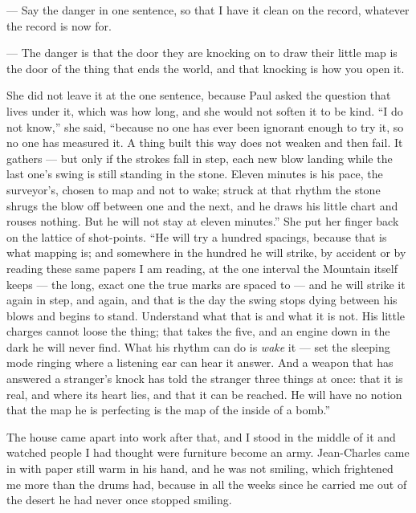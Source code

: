 \begin{room}

--- Say the danger in one sentence, so that I have it clean on the record, whatever the record is now for.

--- The danger is that the door they are knocking on to draw their little map is the door of the thing that ends the world, and that knocking is how you open it.

\end{room}

She did not leave it at the one sentence, because Paul asked the question that lives under it, which was how long, and she would not soften it to be kind. ``I do not know,'' she said, ``because no one has ever been ignorant enough to try it, so no one has measured it. A thing built this way does not weaken and then fail. It gathers --- but only if the strokes fall in step, each new blow landing while the last one's swing is still standing in the stone. Eleven minutes is his pace, the surveyor's, chosen to map and not to wake; struck at that rhythm the stone shrugs the blow off between one and the next, and he draws his little chart and rouses nothing. But he will not stay at eleven minutes.'' She put her finger back on the lattice of shot-points. ``He will try a hundred spacings, because that is what mapping is; and somewhere in the hundred he will strike, by accident or by reading these same papers I am reading, at the one interval the Mountain itself keeps --- the long, exact one the true marks are spaced to --- and he will strike it again in step, and again, and that is the day the swing stops dying between his blows and begins to stand. Understand what that is and what it is not. His little charges cannot loose the thing; that takes the five, and an engine down in the dark he will never find. What his rhythm can do is \emph{wake} it --- set the sleeping mode ringing where a listening ear can hear it answer. And a weapon that has answered a stranger's knock has told the stranger three things at once: that it is real, and where its heart lies, and that it can be reached. He will have no notion that the map he is perfecting is the map of the inside of a bomb.''\par

The house came apart into work after that, and I stood in the middle of it and watched people I had thought were furniture become an army. Jean-Charles came in with paper still warm in his hand, and he was not smiling, which frightened me more than the drums had, because in all the weeks since he carried me out of the desert he had never once stopped smiling.\par

